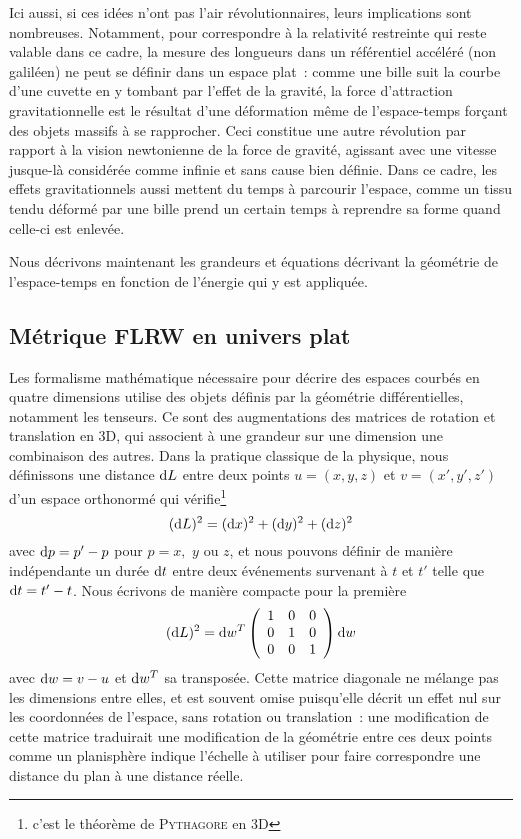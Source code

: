 \documentclass[../main/main.tex]{subfiles}
\begin{document}
Ici aussi, si ces idées n'ont pas l'air révolutionnaires, leurs implications
sont nombreuses. Notamment, pour correspondre à la relativité restreinte qui
reste valable dans ce cadre, la mesure des longueurs dans un référentiel
accéléré (non galiléen) ne peut se définir dans un espace plat~: comme une bille
suit la courbe d'une cuvette en y tombant par l'effet de la gravité, la force
d'attraction gravitationnelle est le résultat d'une déformation même de
l'espace-temps forçant des objets massifs à se rapprocher. Ceci constitue une
autre révolution par rapport à la vision newtonienne de la force de gravité,
agissant avec une vitesse jusque-là considérée comme infinie et sans cause bien
définie. Dans ce cadre, les effets gravitationnels aussi mettent du temps à
parcourir l'espace, comme un tissu tendu déformé par une bille prend un certain
temps à reprendre sa forme quand celle-ci est enlevée.

Nous décrivons maintenant les grandeurs et équations décrivant la géométrie de
l'espace-temps en fonction de l'énergie qui y est appliquée.

\subsection{Métrique FLRW en univers plat}\label{ssec:cons}

Les formalisme mathématique nécessaire pour décrire des espaces courbés en
quatre dimensions utilise des objets définis par la géométrie différentielles,
notamment les tenseurs. Ce sont des augmentations des matrices de rotation et
translation en 3D, qui associent à une grandeur sur une dimension une
combinaison des autres. Dans la pratique classique de la physique, nous
définissons une distance $\mathrm{d} L$ entre deux points $u=(x,y,z)$ et $v=(x',y',z')$
d'un espace orthonormé qui vérifie\footnote{c'est le théorème de
\textsc{Pythagore} en 3D}
\begin{equation}
    (\mathrm{d} L)^2 = (\mathrm{d} x)^2 + (\mathrm{d} y)^2 + (\mathrm{d} z)^2
\end{equation}
avec $\mathrm{d} p = p'-p$ pour $p = x,$ $y$ ou $z$, et nous pouvons définir de manière
indépendante un durée $\mathrm{d} t$ entre deux événements survenant à $t$ et $t'$ telle
que $\mathrm{d} t = t'-t$. Nous écrivons de manière compacte pour la première
\begin{equation}
    (\mathrm{d} L)^2 = \mathrm{d} w^T\left(\begin{array}{c c c}
            1 & 0 & 0\\
            0 & 1 & 0\\
            0 & 0 & 1\\
    \end{array}\right)\mathrm{d} w
\end{equation}
avec $\mathrm{d} w = v-u$ et $\mathrm{d} w^T$ sa transposée. Cette matrice diagonale ne mélange
pas les dimensions entre elles, et est souvent omise puisqu'elle décrit un effet
nul sur les coordonnées de l'espace, sans rotation ou translation~: une
modification de cette matrice traduirait une modification de la géométrie entre
ces deux points comme un planisphère indique l'échelle à utiliser pour faire
correspondre une distance du plan à une distance réelle.
\end{document}
